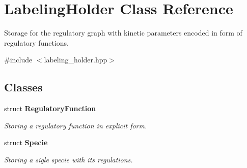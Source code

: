 \hypertarget{classLabelingHolder}{\section{\-Labeling\-Holder \-Class \-Reference}
\label{classLabelingHolder}
}


\-Storage for the regulatory graph with kinetic parameters encoded in form of regulatory functions.  




{\ttfamily \#include $<$labeling\-\_\-holder.\-hpp$>$}

\subsection*{\-Classes}
\begin{DoxyCompactItemize}
\item 
struct {\bfseries \-Regulatory\-Function}
\begin{DoxyCompactList}\small\item\em \-Storing a regulatory function in explicit form. \end{DoxyCompactList}\item 
struct {\bfseries \-Specie}
\begin{DoxyCompactList}\small\item\em \-Storing a sigle specie with its regulations. \end{DoxyCompactList}\end{DoxyCompactItemize}
